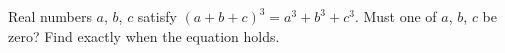Real numbers $a$, $b$, $c$ satisfy $(a+b+c)^3=a^3+b^3+c^3$. Must one of $a$, $b$, $c$ be zero? Find exactly when the equation holds.

